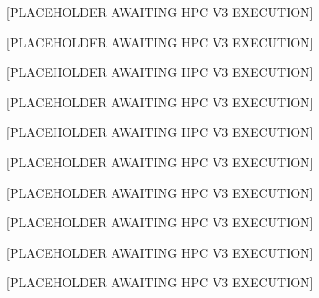 
[PLACEHOLDER AWAITING HPC V3 EXECUTION]

[PLACEHOLDER AWAITING HPC V3 EXECUTION]

[PLACEHOLDER AWAITING HPC V3 EXECUTION]

[PLACEHOLDER AWAITING HPC V3 EXECUTION]

[PLACEHOLDER AWAITING HPC V3 EXECUTION]

[PLACEHOLDER AWAITING HPC V3 EXECUTION]

[PLACEHOLDER AWAITING HPC V3 EXECUTION]

[PLACEHOLDER AWAITING HPC V3 EXECUTION]

[PLACEHOLDER AWAITING HPC V3 EXECUTION]

[PLACEHOLDER AWAITING HPC V3 EXECUTION]

